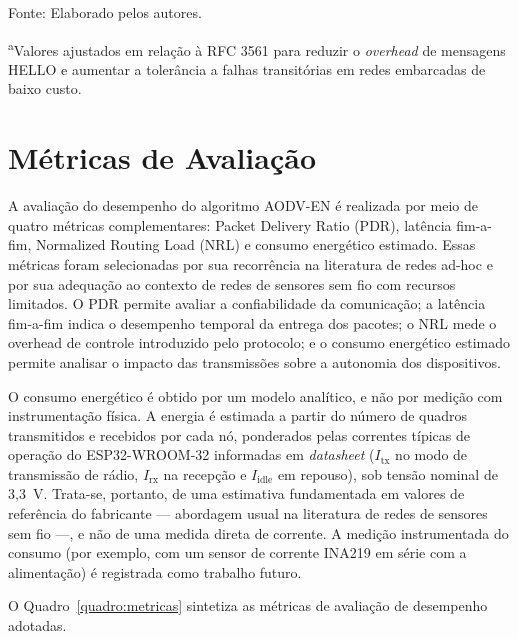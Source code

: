 Fonte: Elaborado pelos autores.

\noindent\footnotesize\textsuperscript{a}Valores ajustados em relação à RFC 3561 para reduzir
o \emph{overhead} de mensagens HELLO e aumentar a tolerância a falhas
transitórias em redes embarcadas de baixo custo.
\normalsize

\section{Métricas de Avaliação}\label{muxe9tricas-de-avaliauxe7uxe3o}

A avaliação do desempenho do algoritmo AODV-EN é realizada por meio
de quatro métricas complementares: Packet Delivery Ratio (PDR), latência
fim-a-fim, Normalized Routing Load (NRL) e consumo energético estimado.
Essas métricas foram selecionadas por sua recorrência na literatura de
redes ad-hoc e por sua adequação ao contexto de redes de sensores sem
fio com recursos limitados. O PDR permite avaliar a confiabilidade da
comunicação; a latência fim-a-fim indica o desempenho temporal da
entrega dos pacotes; o NRL mede o overhead de controle introduzido pelo
protocolo; e o consumo energético estimado permite analisar o impacto
das transmissões sobre a autonomia dos dispositivos.

O consumo energético é obtido por um modelo analítico, e não por medição
com instrumentação física. A energia é estimada a partir do número de
quadros transmitidos e recebidos por cada nó, ponderados pelas correntes
típicas de operação do ESP32-WROOM-32 informadas em \emph{datasheet}
($I_\text{tx}$ no modo de transmissão de rádio, $I_\text{rx}$ na recepção
e $I_\text{idle}$ em repouso), sob tensão nominal de 3,3~V. Trata-se,
portanto, de uma estimativa fundamentada em valores de referência do
fabricante --- abordagem usual na literatura de redes de sensores sem
fio \cite{heinzelman2000} ---, e não de uma medida direta de corrente. A
medição instrumentada do consumo (por exemplo, com um sensor de corrente
INA219 em série com a alimentação) é registrada como trabalho futuro.

O Quadro~\ref{quadro:metricas} sintetiza as métricas de avaliação de desempenho adotadas.

